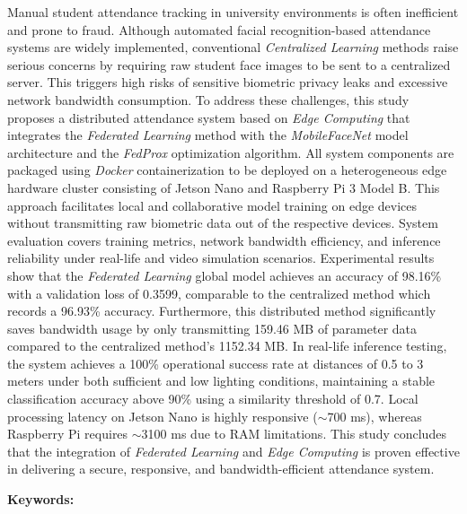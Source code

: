 Manual student attendance tracking in university environments is often inefficient and prone to fraud. Although automated facial recognition-based attendance systems are widely implemented, conventional \textit{Centralized Learning} methods raise serious concerns by requiring raw student face images to be sent to a centralized server. This triggers high risks of sensitive biometric privacy leaks and excessive network bandwidth consumption. To address these challenges, this study proposes a distributed attendance system based on \textit{Edge Computing} that integrates the \textit{Federated Learning} method with the \textit{MobileFaceNet} model architecture and the \textit{FedProx} optimization algorithm. All system components are packaged using \textit{Docker} containerization to be deployed on a heterogeneous edge hardware cluster consisting of Jetson Nano and Raspberry Pi 3 Model B. This approach facilitates local and collaborative model training on edge devices without transmitting raw biometric data out of the respective devices. System evaluation covers training metrics, network bandwidth efficiency, and inference reliability under real-life and video simulation scenarios. Experimental results show that the \textit{Federated Learning} global model achieves an accuracy of 98.16\% with a validation loss of 0.3599, comparable to the centralized method which records a 96.93\% accuracy. Furthermore, this distributed method significantly saves bandwidth usage by only transmitting 159.46 MB of parameter data compared to the centralized method's 1152.34 MB. In real-life inference testing, the system achieves a 100\% operational success rate at distances of 0.5 to 3 meters under both sufficient and low lighting conditions, maintaining a stable classification accuracy above 90\% using a similarity threshold of 0.7. Local processing latency on Jetson Nano is highly responsive ($\sim$700 ms), whereas Raspberry Pi requires $\sim$3100 ms due to RAM limitations. This study concludes that the integration of \textit{Federated Learning} and \textit{Edge Computing} is proven effective in delivering a secure, responsive, and bandwidth-efficient attendance system.

\textbf{Keywords: \keywords{}}
